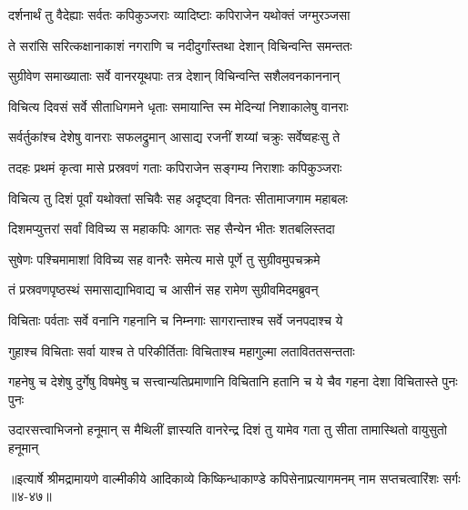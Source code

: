 
\twolineshloka
{दर्शनार्थं तु वैदेह्याः सर्वतः कपिकुञ्जराः}
{व्यादिष्टाः कपिराजेन यथोक्तं जग्मुरञ्जसा} %

\twolineshloka
{ते सरांसि सरित्कक्षानाकाशं नगराणि च}
{नदीदुर्गांस्तथा देशान् विचिन्वन्ति समन्ततः} %

\twolineshloka
{सुग्रीवेण समाख्याताः सर्वे वानरयूथपाः}
{तत्र देशान् विचिन्वन्ति सशैलवनकाननान्} %

\twolineshloka
{विचित्य दिवसं सर्वे सीताधिगमने धृताः}
{समायान्ति स्म मेदिन्यां निशाकालेषु वानराः} %

\twolineshloka
{सर्वर्तुकांश्च देशेषु वानराः सफलद्रुमान्}
{आसाद्य रजनीं शय्यां चक्रुः सर्वेष्वहःसु ते} %

\twolineshloka
{तदहः प्रथमं कृत्वा मासे प्रस्रवणं गताः}
{कपिराजेन सङ्गम्य निराशाः कपिकुञ्जराः} %

\twolineshloka
{विचित्य तु दिशं पूर्वां यथोक्तां सचिवैः सह}
{अदृष्ट्वा विनतः सीतामाजगाम महाबलः} %

\twolineshloka
{दिशमप्युत्तरां सर्वां विविच्य स महाकपिः}
{आगतः सह सैन्येन भीतः शतबलिस्तदा} %

\twolineshloka
{सुषेणः पश्चिमामाशां विविच्य सह वानरैः}
{समेत्य मासे पूर्णे तु सुग्रीवमुपचक्रमे} %

\twolineshloka
{तं प्रस्रवणपृष्ठस्थं समासाद्याभिवाद्य च}
{आसीनं सह रामेण सुग्रीवमिदमब्रुवन्} %

\twolineshloka
{विचिताः पर्वताः सर्वे वनानि गहनानि च}
{निम्नगाः सागरान्ताश्च सर्वे जनपदाश्च ये} %

\twolineshloka
{गुहाश्च विचिताः सर्वा याश्च ते परिकीर्तिताः}
{विचिताश्च महागुल्मा लताविततसन्तताः} %

\threelineshloka
{गहनेषु च देशेषु दुर्गेषु विषमेषु च}
{सत्त्वान्यतिप्रमाणानि विचितानि हतानि च}
{ये चैव गहना देशा विचितास्ते पुनः पुनः} %

\twolineshloka
{उदारसत्त्वाभिजनो हनूमान् स मैथिलीं ज्ञास्यति वानरेन्द्र}
{दिशं तु यामेव गता तु सीता तामास्थितो वायुसुतो हनूमान्} %


॥इत्यार्षे श्रीमद्रामायणे वाल्मीकीये आदिकाव्ये किष्किन्धाकाण्डे कपिसेनाप्रत्यागमनम् नाम सप्तचत्वारिंशः सर्गः ॥४-४७॥
